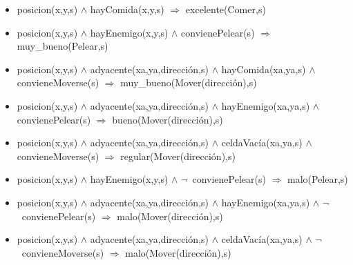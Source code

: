 \begin{itemize}

\item posicion(x,y,s) $\land$ hayComida(x,y,s) $\Rightarrow$ excelente(Comer,s)

\item posicion(x,y,s) $\land$ hayEnemigo(x,y,s) $\land$ convienePelear(s)
$\Rightarrow$ \newline muy\_bueno(Pelear,s)

\item posicion(x,y,s) $\land$ adyacente(xa,ya,dirección,s) $\land$
hayComida(xa,ya,s) $\land$ \newline convieneMoverse(s) $\Rightarrow$
muy\_bueno(Mover(dirección),s)

\item posicion(x,y,s) $\land$ adyacente(xa,ya,dirección,s) $\land$
hayEnemigo(xa,ya,s)  $\land$ convienePelear(s) $\Rightarrow$
bueno(Mover(dirección),s)

\item posicion(x,y,s) $\land$ adyacente(xa,ya,dirección,s) $\land$
celdaVacía(xa,ya,s) $\land$ convieneMoverse(s) $\Rightarrow$
regular(Mover(dirección),s)

\item posicion(x,y,s) $\land$ hayEnemigo(x,y,s) $\land$ $\lnot$~convienePelear(s)
$\Rightarrow$ malo(Pelear,s)

\item posicion(x,y,s) $\land$ adyacente(xa,ya,dirección,s) $\land$
hayEnemigo(xa,ya,s) $\land$ $\lnot$~convienePelear(s)
$\Rightarrow$ malo(Mover(dirección),s)

\item posicion(x,y,s) $\land$ adyacente(xa,ya,dirección,s) $\land$
celdaVacía(xa,ya,s) $\land$ $\lnot$~convieneMoverse(s)
$\Rightarrow$ malo(Mover(dirección),s)

\end{itemize}

